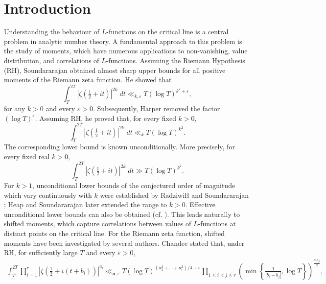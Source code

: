 \documentclass[twoside,reqno,11pt,a4paper]{amsart}
\numberwithin{equation}{section}
\theoremstyle{plain}
\theoremstyle{definition}
\theoremstyle{remark}
\renewcommand{\le}{\leqslant}
\begin{document}
\section{Introduction}      
Understanding the behaviour of $L$-functions on the critical line is a central problem in analytic number theory. A fundamental approach to this problem is the study of moments, which have numerous applications to non-vanishing, value distribution, and correlations of $L$-functions. Assuming the Riemann Hypothesis (RH), Soundararajan \cite{Sound} obtained almost sharp upper bounds for all positive moments of the Riemann zeta function. He showed that 
	\begin{equation*}
	\int_{T}^{2T}\left| \zeta\left(\tfrac{1}{2}+it\right)\right|^{2k}\;dt\ll_{k,\varepsilon} T(\log T)^{k^2 +\varepsilon},
	\end{equation*}
	for any $k>0$ and every $\varepsilon>0$.
	Subsequently, Harper \cite{Harper} removed the factor $(\log T)^{\varepsilon}$. Assuming RH, he proved that, for every fixed $k>0$,
	\begin{equation}\label{harper-upper-bound}
\int_{T}^{2T}\left| \zeta\left(\tfrac{1}{2}+it\right)\right|^{2k}\;dt\ll_{k} T(\log T)^{k^2}.
	\end{equation}
The corresponding lower bound is known unconditionally. More precisely, for every fixed real $k>0$,
\begin{equation*}
\int_T^{2T}|\zeta(\tfrac{1}{2}+it)|^{2k}\;dt\gg T(\log T)^{k^2}.
\end{equation*}
For $k>1$, unconditional lower bounds of the conjectured order of magnitude which vary continuously with $k$ were established by Radziwi{\l}{\l} and Soundararajan \cite{Raziwill-Sound}; Heap and Soundararajan \cite{Heap-Sound} later extended the range to $k>0$. Effective unconditional lower bounds can also be obtained (cf. \cite{Conrey-Ghosh-III, DP, Page, Sound-mean-values}).
This leads naturally to shifted moments, which capture correlations between values of $L$-functions at distinct points on the critical line. For the Riemann zeta function, shifted moments have been investigated by several authors. Chandee \cite[Theorem~1.1]{Chandee_shifted} stated that, under RH, for sufficiently large $T$ and every $\varepsilon>0$,
\begin{align*}
	\int_{T}^{2T} \prod_{i=1}^{r}\left| \zeta\left(\tfrac{1}{2}+i(t+b_i)\right)\right|^{a_i}\ll_{\mathbf{a},\varepsilon} T(\log T)^{(a_1^2+\cdots + a_{r}^2)/4+\varepsilon} \prod_{1\le  i<j\le  r}\left(\min\left\{\tfrac{1}{|b_i-b_j|},\log T \right\}\right)^{\tfrac{a_ia_j}{2}},
\end{align*}
\end{document}
